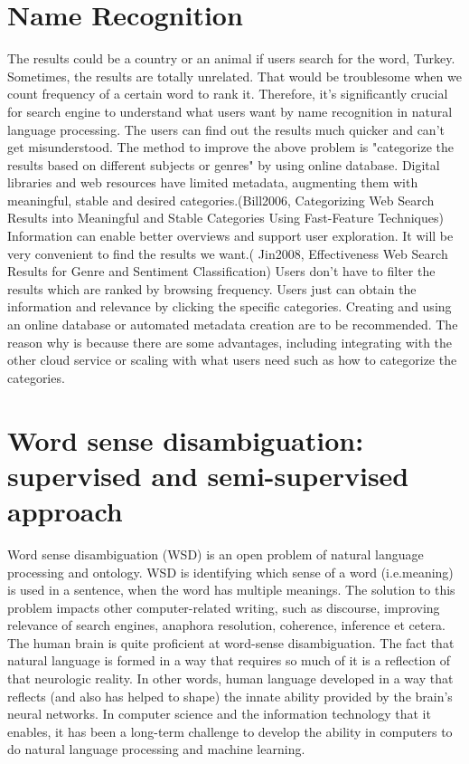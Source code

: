 \section*{Name Recognition}
The results could be a country or an animal if users search for the word, Turkey. Sometimes, the results are totally unrelated. That would be troublesome when we count frequency of a certain word to rank it. 
Therefore, it's significantly crucial for search engine to understand what users want by name recognition in natural language processing. The users can find out the results much quicker and can't get misunderstood.
The method to improve the above problem is "categorize the results based on different subjects or genres" by using online database. Digital libraries and web resources have limited metadata, augmenting them with meaningful, stable and desired categories.(Bill2006, Categorizing Web Search Results into Meaningful and Stable Categories Using Fast-Feature Techniques)
Information can enable better overviews and support user exploration. It will be very convenient to find the results we want.( Jin2008, Effectiveness Web Search Results for Genre and Sentiment Classification) Users don't have to filter the results which are ranked by browsing frequency. Users just can obtain the information and relevance by clicking the specific categories. 
Creating and using an online database or automated metadata creation are to be recommended. The reason why is because there are some advantages, including integrating with the other cloud service or scaling with what users need such as how to categorize the categories.\\


\section*{Word sense disambiguation: supervised and semi-supervised approach}

Word sense disambiguation (WSD) is an open problem of natural language processing and ontology. WSD is identifying which sense of a word (i.e.meaning) is used in a sentence, when the word has multiple meanings. The solution to this problem impacts other computer-related writing, such as discourse, improving relevance of search engines, anaphora resolution, coherence, inference et cetera.
The human brain is quite proficient at word-sense disambiguation. The fact that natural language is formed in a way that requires so much of it is a reflection of that neurologic reality. In other words, human language developed in a way that reflects (and also has helped to shape) the innate ability provided by the brain's neural networks. In computer science and the information technology that it enables, it has been a long-term challenge to develop the ability in computers to do natural language processing and machine learning.
